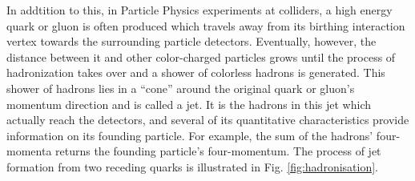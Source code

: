 


In addtition to this, in Particle Physics experiments at colliders, a high energy quark or gluon is often produced which travels away from its birthing interaction vertex towards the surrounding particle detectors. Eventually, however, the distance between it and other color-charged particles grows until the process of hadronization takes over and a shower of colorless hadrons is generated. This shower of hadrons lies in a ``cone'' around the original quark or gluon's momentum direction and is called a jet. It is the hadrons in this jet which actually reach the detectors, and several of its quantitative characteristics provide information on its founding particle. For example, the  sum of the hadrons' four-momenta returns the founding particle's four-momentum. The process of jet formation from two receding quarks is illustrated in Fig. \ref{fig:hadronisation}. 



